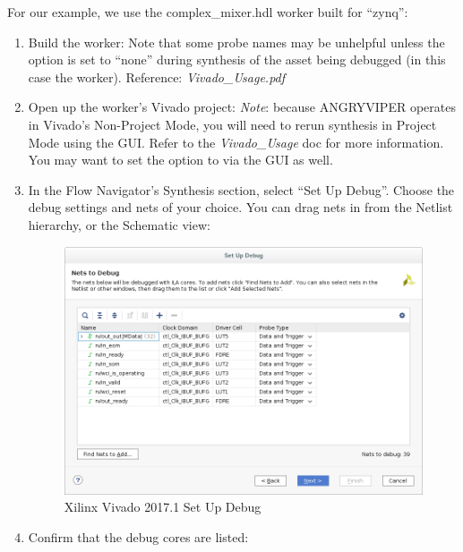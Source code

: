 \begin{flushleft}
	For our example, we use the complex\_mixer.hdl worker built for ``zynq'':
	\begin{enumerate}
		\item Build the worker:
			\subitem {}
			\subitem {}
			\subsubitem Note that some probe names may be unhelpful unless the  option is set to ``none''
			\subsubitem during synthesis of the asset being debugged (in this case the worker). Reference: \textit{Vivado\_Usage.pdf}\newline
		\item Open up the worker's Vivado project:
			\subitem {}
			\subitem {}
			\subitem \textit{Note}: because ANGRYVIPER operates in Vivado's Non-Project Mode, you will need to rerun synthesis 
			\subitem in Project Mode using the GUI. Refer to the \textit{Vivado\_Usage} doc for more information. You may want to 
			\subitem set the  option to  via the GUI as well.
		\item In the Flow Navigator's Synthesis section, select ``Set Up Debug''. Choose the debug settings and nets of your choice. You can drag nets in from the Netlist hierarchy, or the Schematic view:
			\begin{figure}[H]
				\centerline{\includegraphics[scale=0.6]			{figures/xilinx_vivado_2017_set_up_debug}}
					\caption{Xilinx Vivado 2017.1 Set Up Debug}
			\end{figure}
		\item Confirm that the debug cores are listed:

\end{enumerate}
\end{flushleft}
